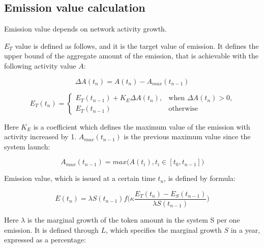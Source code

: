 \documentclass[a4paper,12pt]{article}
\begin{document}

\subsection{Emission value calculation}

Emission value depends on network activity growth.

$E_T$ value is defined as follows, and it is the target value of emission. It defines the upper bound of the aggregate amount of the emission, that is achievable with the following activity value $A$:

% 

$$
\Delta A(t_n) = A(t_n) - A_{max}(t_{n-1})
$$

$$
E_T(t_n) = \begin{cases}
 E_T(t_{n-1}) + K_E \Delta A(t_n),
 & \text{when $\Delta A(t_n) > 0$,}\\
 E_T(t_{n-1}) & \text{otherwise}
\end{cases}
$$

Here $K_E$ is a coefficient which defines the maximum value of the emission with activity increased by 1. $A_{max}(t_{n-1})$ is the previous maximum value since the system launch:


$$
    A_{max}(t_{n-1}) = max \Big ( A(t_i), t_i \in [t_0, t_{n-1}] \Big )
$$

Emission value, which is issued at a certain time $t_n$, is defined by formula:


$$
    E(t_n) = \lambda S(t_{n-1}) f \Big( \kappa \frac {E_T(t_n) - E_S(t_{n-1})}{\lambda S(t_{n-1})} \Big)
$$

Here $\lambda$ is the marginal growth of the token amount in the system S per one emission. It is defined through $L$, which specifies the marginal growth $S$ in a year, expressed as a percentage:

\end{document}
